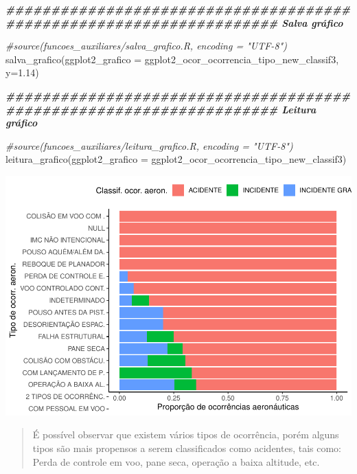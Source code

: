 \documentclass[
]{article}
\newenvironment{Shaded}{\begin{snugshade}}{\end{snugshade}}
\newcommand{\AttributeTok}[1]{\textcolor[rgb]{0.77,0.63,0.00}{#1}}
\newcommand{\CommentTok}[1]{\textcolor[rgb]{0.56,0.35,0.01}{\textit{#1}}}
\newcommand{\DocumentationTok}[1]{\textcolor[rgb]{0.56,0.35,0.01}{\textbf{\textit{#1}}}}
\newcommand{\FloatTok}[1]{\textcolor[rgb]{0.00,0.00,0.81}{#1}}
\newcommand{\FunctionTok}[1]{\textcolor[rgb]{0.00,0.00,0.00}{#1}}
\newcommand{\NormalTok}[1]{#1}
\begin{document}
\begin{Shaded}
\begin{Highlighting}[]
\DocumentationTok{\#\#\#\#\#\#\#\#\#\#\#\#\#\#\#\#\#\#\#\#\#\#\#\#\#\#\#\#\#\#\#\#\#\#\#\#\#\#\#\#\#\#\#\#\#\#\#\#\#\#\#\#\#\#\#\#\#\#\#\#\#\#\#\#\#\#\#\# Salva gráfico}

\CommentTok{\#source(\textquotesingle{}funcoes\_auxiliares/salva\_grafico.R\textquotesingle{}, encoding = "UTF{-}8")}
\FunctionTok{salva\_grafico}\NormalTok{(}\AttributeTok{ggplot2\_grafico =}\NormalTok{ ggplot2\_ocor\_ocorrencia\_tipo\_new\_classif3, }\AttributeTok{y=}\FloatTok{1.14}\NormalTok{)}

\DocumentationTok{\#\#\#\#\#\#\#\#\#\#\#\#\#\#\#\#\#\#\#\#\#\#\#\#\#\#\#\#\#\#\#\#\#\#\#\#\#\#\#\#\#\#\#\#\#\#\#\#\#\#\#\#\#\#\#\#\#\#\#\#\#\#\#\#\#\#\#\# Leitura gráfico}

\CommentTok{\#source(\textquotesingle{}funcoes\_auxiliares/leitura\_grafico.R\textquotesingle{}, encoding = "UTF{-}8")}
\FunctionTok{leitura\_grafico}\NormalTok{(}\AttributeTok{ggplot2\_grafico =}\NormalTok{ ggplot2\_ocor\_ocorrencia\_tipo\_new\_classif3)}
\end{Highlighting}
\end{Shaded}

\begin{center}\includegraphics{4.Relatorio/pdf/index_files/figure-latex/unnamed-chunk-48-2} \end{center}

\begin{quote}
É possível observar que existem vários tipos de ocorrência, porém alguns
tipos são mais propensos a serem classificados como acidentes, tais
como: Perda de controle em voo, pane seca, operação a baixa altitude,
etc.
\end{quote}
\end{document}
